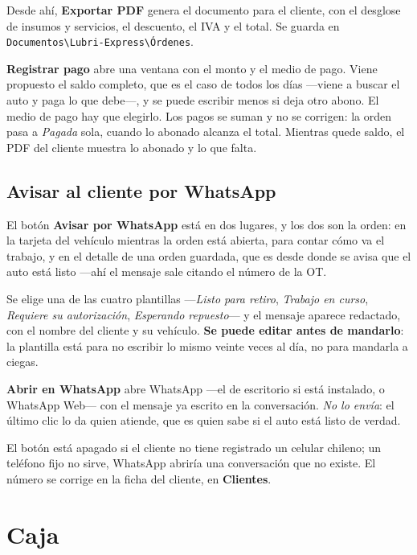 \documentclass[11pt,a4paper]{article}
\begin{document}

Desde ahí, \textbf{Exportar PDF} genera el documento para el cliente, con el
desglose de insumos y servicios, el descuento, el IVA y el total. Se guarda en
\texttt{Documentos\textbackslash Lubri-Express\textbackslash Órdenes}.

\textbf{Registrar pago} abre una ventana con el monto y el medio de pago. Viene
propuesto el saldo completo, que es el caso de todos los días —viene a buscar el
auto y paga lo que debe—, y se puede escribir menos si deja otro abono. El medio
de pago hay que elegirlo. Los pagos se suman y
no se corrigen: la orden pasa a \emph{Pagada} sola, cuando lo abonado alcanza el
total. Mientras quede saldo, el PDF del cliente muestra lo abonado y lo que
falta.

\subsection{Avisar al cliente por WhatsApp}

El botón \textbf{Avisar por WhatsApp} está en dos lugares, y los dos son la
orden: en la tarjeta del vehículo mientras la orden está abierta, para contar
cómo va el trabajo, y en el detalle de una orden guardada, que es desde donde se
avisa que el auto está listo —ahí el mensaje sale citando el número de la OT.

Se elige una de las cuatro plantillas —\emph{Listo para retiro}, \emph{Trabajo
en curso}, \emph{Requiere su autorización}, \emph{Esperando repuesto}— y el
mensaje aparece redactado, con el nombre del cliente y su vehículo.
\textbf{Se puede editar antes de mandarlo}: la plantilla está para no escribir lo
mismo veinte veces al día, no para mandarla a ciegas.

\textbf{Abrir en WhatsApp} abre WhatsApp —el de escritorio si está instalado, o
WhatsApp Web— con el mensaje ya escrito en la conversación. \emph{No lo envía}:
el último clic lo da quien atiende, que es quien sabe si el auto está listo de
verdad.

El botón está apagado si el cliente no tiene registrado un celular chileno; un
teléfono fijo no sirve, WhatsApp abriría una conversación que no existe. El
número se corrige en la ficha del cliente, en \textbf{Clientes}.

\section{Caja}
\end{document}
